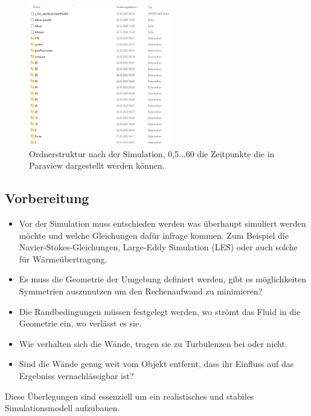 \begin{figure}
    \centering
    \includegraphics[width=0.55\textwidth]{papers/openfoam/Bilder/Ordnerstruktur_Simuliert.jpg}
    \caption{Ordnerstruktur nach der Simulation, 0,5...60 die Zeitpunkte die in Paraview dargestellt werden können.}
    \label{fig:ordStrktSim}
\end{figure}


\subsection{Vorbereitung \label{openfoam:section:Vorbereitung}}
\begin{itemize}
    \item Vor der Simulation muss entschieden werden was überhaupt simuliert werden möchte und welche Gleichungen dafür infrage kommen.
Zum Beispiel die Navier-Stokes-Gleichungen, Large-Eddy Simulation (LES) oder auch solche für Wärmeübertragung.
    \item Es muss die Geometrie der Umgebung definiert werden, gibt es möglichkeiten Symmetrien auszunutzen um den Rechenaufwand zu minimieren?
    \item Die Randbedingungen müssen festgelegt werden, wo strömt das Fluid in die Geometrie ein, wo verlässt es sie.
    \item Wie verhalten sich die Wände, tragen sie zu Turbulenzen bei oder nicht.
    \item Sind die Wände genug weit vom Objekt entfernt, dass ihr Einfluss auf das Ergebniss vernachlässigbar ist?
\end{itemize} 

Diese Überlegungen sind essenziell um ein realistisches und stabiles Simulationsmodell aufzubauen.


